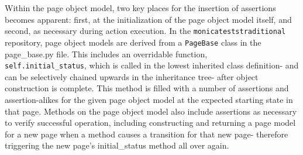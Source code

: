 Within the page object model, two key places for the insertion of assertions becomes apparent: first, at the initialization of the page object model itself, and second, as necessary during action execution. In the \texttt{monica\-tests\-traditional} repository, page object models are derived from a \texttt{PageBase} class in the page\_base.py file. This includes an overridable function, \\\texttt{self.initial\_status}, which is called in the lowest inherited class definition- and can be selectively chained upwards in the inheritance tree- after object construction is complete. This method is filled with a number of assertions and assertion-alikes for the given page object model at the expected starting state in that page. Methods on the page object model also include assertions as necessary to verify successful operation, including constructing and returning a page model for a new page when a method causes a transition for that new page- therefore triggering the new page's initial\_status method all over again.
